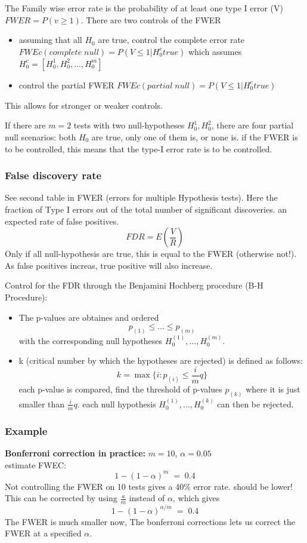 \documentclass{article}
\begin{document}
The Family wise error rate is the probability of at least one type I error (V) $FWER = P(v \geq 1)$.
There are two controls of the FWER 
\begin{itemize}
\item assuming that all $H_0$ are true, control the complete error rate $FWEc(complete \; null) = P(V \leq 1 |H_0 ^c true) $ which assumes $H_0 ^c = [H_0 ^1, H_0^2, ..., H_0 ^m]$
\item control the partial FWER $FWEc(partial \; null) = P(V \leq 1 |H_0 ^c true) $
\end{itemize}
This allows for stronger or weaker controls.\par 
If there are $m = 2$ tests with two null-hypotheses $H_0 ^1, H_0^2$, there are four partial null scenarios: both $H_0$ are true, only one of them is, or none is. if the FWER is to be controlled, this means that the type-I error rate is to be controlled.

\subsubsection{False discovery rate}

See second table in FWER (errors for multiple Hypothesis tests). Here the fraction of Type I errors out of the total number of significant discoveries. an expected rate of false positives. $$FDR = E\left( \frac{V}{R}\right) $$
Only if all null-hypothesis are true, this is equal to the FWER (otherwise not!). As false positives increas, true positive will also increase.

Control for the FDR through the Benjamini Hochberg procedure (B-H Procedure):
\begin{itemize}
\item The p-values are obtaines and ordered $$p_{(1)} \leq ... \leq p_{(m)}$$ with the corresponding null hypotheses $H_0^{(1)} , ..., H_0^{(m)}$.
\item k (critical number by which the hypotheses are rejected) is defined as follows: 
\begin{equation*}
k = \max \Big\{ i: p_{(i)} \leq \frac{i}{m}q \Big\}
\end{equation*}
each p-value is compared, find the threshold of p-values $p_{(k)}$ where it is just smaller than $\frac{i}{m}q$. each null hypothesis $H_0^{(1)} , ..., H_0^{(k)}$ can then be rejected.
\end{itemize}

\subsubsection{Example}
\textbf{Bonferroni correction in practice:} $m = 10$, $\alpha = 0.05$ \\
estimate FWEC: $$1-(1-\alpha)^m \; = \; 0.4$$
Not controlling the FWER on 10 tests gives a 40\% error rate. should be lower! This can be corrected by using $\frac{a}{m}$ instead of $\alpha$, which gives $$1-(1-\alpha)^{\alpha/m} \; = \; 0.4$$
The FWER is much smaller now, The bonferroni corrections lets us correct the FWER at a specified $\alpha$.
\end{document}
